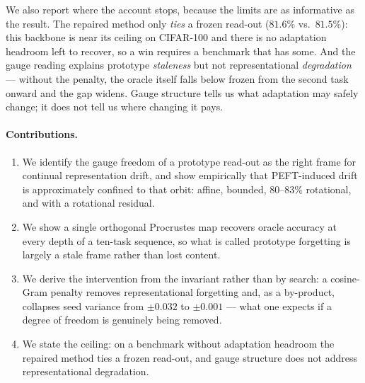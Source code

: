 We also report where the account stops, because the limits are as informative as
the result. The repaired method only \emph{ties} a frozen read-out
($81.6\%$ vs.\ $81.5\%$): this backbone is near its ceiling on CIFAR-100 and
there is no adaptation headroom left to recover, so a win requires a benchmark
that has some. And the gauge reading explains prototype \emph{staleness} but not
representational \emph{degradation} --- without the penalty, the oracle itself
falls below frozen from the second task onward and the gap widens. Gauge
structure tells us what adaptation may safely change; it does not tell us where
changing it pays.

\paragraph{Contributions.}
\begin{enumerate}\itemsep0pt
  \item We identify the gauge freedom of a prototype read-out as the right frame
        for continual representation drift, and show empirically that
        PEFT-induced drift is approximately confined to that orbit: affine,
        bounded, $80$--$83\%$ rotational, and with a rotational residual.
  \item We show a single orthogonal Procrustes map recovers oracle accuracy at
        every depth of a ten-task sequence, so what is called prototype
        forgetting is largely a stale frame rather than lost content.
  \item We derive the intervention from the invariant rather than by search: a
        cosine-Gram penalty removes representational forgetting and, as a
        by-product, collapses seed variance from $\pm0.032$ to $\pm0.001$ ---
        what one expects if a degree of freedom is genuinely being removed.
  \item We state the ceiling: on a benchmark without adaptation headroom the
        repaired method ties a frozen read-out, and gauge structure does not
        address representational degradation.
\end{enumerate}


